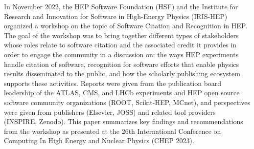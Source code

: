 In November 2022, the HEP Software Foundation (HSF) and the Institute for Research and Innovation for Software in High-Energy Physics (IRIS-HEP) organized a workshop on the topic of Software Citation and Recognition in HEP.
The goal of the workshop was to bring together different types of stakeholders whose roles relate to software citation and the associated credit it provides in order to engage the community in a discussion on: the ways HEP experiments handle citation of software, recognition for software efforts that enable physics results disseminated to the public, and how the scholarly publishing ecosystem supports these activities.
Reports were given from the publication board leadership of the ATLAS, CMS, and LHCb experiments and HEP open source software community organizations (ROOT, Scikit-HEP, MCnet), and perspectives were given from publishers (Elsevier, JOSS) and related tool providers (INSPIRE, Zenodo).
This paper summarizes key findings and recommendations from the workshop as presented at the 26th International Conference on Computing In High Energy and Nuclear Physics (CHEP 2023).
